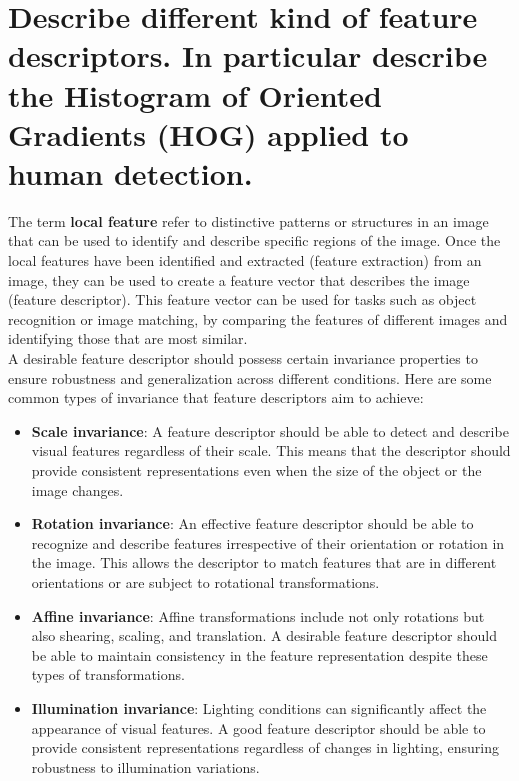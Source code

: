 \documentclass{article}
\begin{document}
\newpage

\section*{Describe different kind of feature descriptors. In particular describe the Histogram of Oriented Gradients (HOG) applied to human detection.}

The term \textbf{local feature} refer to distinctive patterns or structures in an image that can be used to identify and describe specific regions of the image. Once the local features have been identified and extracted (feature extraction) from an image, they can be used to create a feature vector that describes the image (feature descriptor). This feature vector can be used for tasks such as object recognition or image matching, by comparing the features of different images and identifying those that are most similar. \\

A desirable feature descriptor should possess certain invariance properties to ensure robustness and generalization across different conditions. Here are some common types of invariance that feature descriptors aim to achieve:

\begin{itemize}
    \item \textbf{Scale invariance}: A feature descriptor should be able to detect and describe visual features regardless of their scale. This means that the descriptor should provide consistent representations even when the size of the object or the image changes.
    \item \textbf{Rotation invariance}: An effective feature descriptor should be able to recognize and describe features irrespective of their orientation or rotation in the image. This allows the descriptor to match features that are in different orientations or are subject to rotational transformations.
    \item \textbf{Affine invariance}: Affine transformations include not only rotations but also shearing, scaling, and translation. A desirable feature descriptor should be able to maintain consistency in the feature representation despite these types of transformations.    
    \item \textbf{Illumination invariance}: Lighting conditions can significantly affect the appearance of visual features. A good feature descriptor should be able to provide consistent representations regardless of changes in lighting, ensuring robustness to illumination variations.
\end{itemize}
\end{document}
